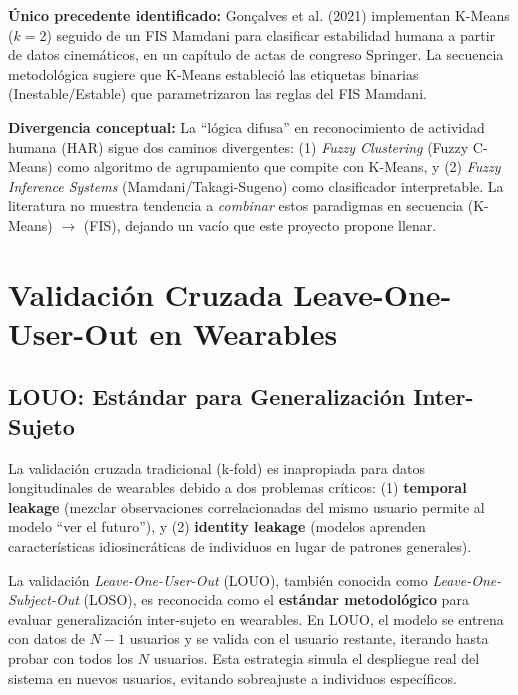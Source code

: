 \textbf{Único precedente identificado:} Gonçalves et al. (2021) implementan K-Means ($k=2$) seguido de un FIS Mamdani para clasificar estabilidad humana a partir de datos cinemáticos, en un capítulo de actas de congreso Springer. La secuencia metodológica sugiere que K-Means estableció las etiquetas binarias (Inestable/Estable) que parametrizaron las reglas del FIS Mamdani.

\textbf{Divergencia conceptual:} La ``lógica difusa'' en reconocimiento de actividad humana (HAR) sigue dos caminos divergentes: (1) \textit{Fuzzy Clustering} (Fuzzy C-Means) como algoritmo de agrupamiento que compite con K-Means, y (2) \textit{Fuzzy Inference Systems} (Mamdani/Takagi-Sugeno) como clasificador interpretable. La literatura no muestra tendencia a \textit{combinar} estos paradigmas en secuencia (K-Means) $\rightarrow$ (FIS), dejando un vacío que este proyecto propone llenar.

\section{Validación Cruzada Leave-One-User-Out en Wearables}
\label{sec:louo_wearables}

\subsection{LOUO: Estándar para Generalización Inter-Sujeto}
\label{subsec:louo_estandar}

La validación cruzada tradicional (k-fold) es inapropiada para datos longitudinales de wearables debido a dos problemas críticos: (1) \textbf{temporal leakage} (mezclar observaciones correlacionadas del mismo usuario permite al modelo ``ver el futuro''), y (2) \textbf{identity leakage} (modelos aprenden características idiosincráticas de individuos en lugar de patrones generales).

La validación \textit{Leave-One-User-Out} (LOUO), también conocida como \textit{Leave-One-Subject-Out} (LOSO), es reconocida como el \textbf{estándar metodológico} para evaluar generalización inter-sujeto en wearables. En LOUO, el modelo se entrena con datos de $N-1$ usuarios y se valida con el usuario restante, iterando hasta probar con todos los $N$ usuarios. Esta estrategia simula el despliegue real del sistema en nuevos usuarios, evitando sobreajuste a individuos específicos.

